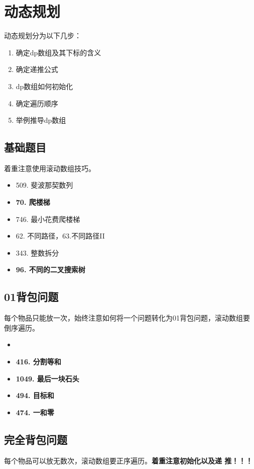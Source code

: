 \documentclass[a4paper,twoside]{ctexart}
\begin{document}
\section{动态规划}

动态规划分为以下几步：
\begin{enumerate}
\item 确定dp数组及其下标的含义
\item 确定递推公式
\item dp数组如何初始化
\item 确定遍历顺序
\item 举例推导dp数组
\end{enumerate}

\subsection{基础题目}
着重注意使用滚动数组技巧。

\begin{itemize}
\item 509. 斐波那契数列
\item \textbf{70. 爬楼梯}
\item 746. 最小花费爬楼梯
\item 62. 不同路径，63.不同路径II
\item 343. 整数拆分
\item \textbf{96. 不同的二叉搜索树}
\end{itemize}

\subsection{01背包问题}
每个物品只能放一次，始终注意如何将一个问题转化为01背包问题，滚动数组要
倒序遍历。

\begin{itemize}
\item \item \textbf{416. 分割等和}
\item \textbf{1049. 最后一块石头}
\item \textbf{494. 目标和}
\item \textbf{474. 一和零}
\end{itemize}

\subsection{完全背包问题}
每个物品可以放无数次，滚动数组要正序遍历。\textbf{着重注意初始化以及递
  推！！！}
\end{document}
